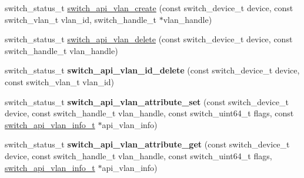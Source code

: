 \begin{DoxyCompactItemize}
\item 
switch\+\_\+status\+\_\+t \hyperlink{group__VLAN_ga312a8e04ecebcacacd610e639c77d906}{switch\+\_\+api\+\_\+vlan\+\_\+create} (const switch\+\_\+device\+\_\+t device, const switch\+\_\+vlan\+\_\+t vlan\+\_\+id, switch\+\_\+handle\+\_\+t $\ast$vlan\+\_\+handle)
\item 
switch\+\_\+status\+\_\+t \hyperlink{group__VLAN_ga1eaeb5260ef20b99e060aab6c9458508}{switch\+\_\+api\+\_\+vlan\+\_\+delete} (const switch\+\_\+device\+\_\+t device, const switch\+\_\+handle\+\_\+t vlan\+\_\+handle)
\item 
\hypertarget{group__VLAN_ga718c3b3f5d3e0a53e4ba393c9ecfcc76}{switch\+\_\+status\+\_\+t {\bfseries switch\+\_\+api\+\_\+vlan\+\_\+id\+\_\+delete} (const switch\+\_\+device\+\_\+t device, const switch\+\_\+vlan\+\_\+t vlan\+\_\+id)}\label{group__VLAN_ga718c3b3f5d3e0a53e4ba393c9ecfcc76}

\item 
\hypertarget{group__VLAN_gad1a38137dc31133e378adbcb15dbb272}{switch\+\_\+status\+\_\+t {\bfseries switch\+\_\+api\+\_\+vlan\+\_\+attribute\+\_\+set} (const switch\+\_\+device\+\_\+t device, const switch\+\_\+handle\+\_\+t vlan\+\_\+handle, const switch\+\_\+uint64\+\_\+t flags, const \hyperlink{structswitch__api__vlan__info__s}{switch\+\_\+api\+\_\+vlan\+\_\+info\+\_\+t} $\ast$api\+\_\+vlan\+\_\+info)}\label{group__VLAN_gad1a38137dc31133e378adbcb15dbb272}

\item 
\hypertarget{group__VLAN_ga74d1c86e835303f5c908dbed41a7f79c}{switch\+\_\+status\+\_\+t {\bfseries switch\+\_\+api\+\_\+vlan\+\_\+attribute\+\_\+get} (const switch\+\_\+device\+\_\+t device, const switch\+\_\+handle\+\_\+t vlan\+\_\+handle, const switch\+\_\+uint64\+\_\+t flags, \hyperlink{structswitch__api__vlan__info__s}{switch\+\_\+api\+\_\+vlan\+\_\+info\+\_\+t} $\ast$api\+\_\+vlan\+\_\+info)}\label{group__VLAN_ga74d1c86e835303f5c908dbed41a7f79c}


\end{DoxyCompactItemize}
